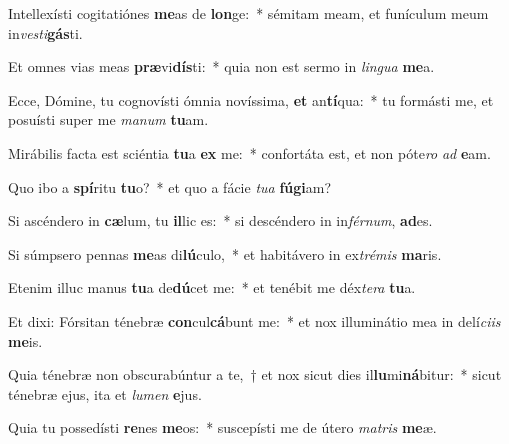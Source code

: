\item Intellexísti cogitatiónes \textbf{me}as de \textbf{lon}ge:~* sémitam meam, et funículum meum in\textit{ves}\textit{ti}\textbf{gás}ti.
\item Et omnes vias meas \textbf{præ}vi\textbf{dís}ti:~* quia non est sermo in \textit{lin}\textit{gua} \textbf{me}a.
\item Ecce, Dómine, tu cognovísti ómnia novíssima, \textbf{et} an\textbf{tí}qua:~* tu formásti me, et posuísti super me \textit{ma}\textit{num} \textbf{tu}am.
\item Mirábilis facta est sciéntia \textbf{tu}a \textbf{ex} me:~* confortáta est, et non póte\textit{ro} \textit{ad} \textbf{e}am.
\item Quo ibo a \textbf{spí}ritu \textbf{tu}o?~* et quo a fácie \textit{tu}\textit{a} \textbf{fú}\textbf{gi}am?
\item Si ascéndero in \textbf{cæ}lum, tu \textbf{il}lic es:~* si descéndero in in\textit{fér}\textit{num}, \textbf{ad}es.
\item Si súmpsero pennas \textbf{me}as di\textbf{lú}culo,~* et habitávero in ex\textit{tré}\textit{mis} \textbf{ma}ris.
\item Etenim illuc manus \textbf{tu}a de\textbf{dú}cet me:~* et tenébit me déx\textit{te}\textit{ra} \textbf{tu}a.
\item Et dixi: Fórsitan ténebræ \textbf{con}cul\textbf{cá}bunt me:~* et nox illuminátio mea in delí\textit{ci}\textit{is} \textbf{me}is.
\item Quia ténebræ non obscurabúntur a te,~† et nox sicut dies il\textbf{lu}mi\textbf{ná}bitur:~* sicut ténebræ ejus, ita et \textit{lu}\textit{men} \textbf{e}jus.
\item Quia tu possedísti \textbf{re}nes \textbf{me}os:~* suscepísti me de útero \textit{ma}\textit{tris} \textbf{me}æ.
